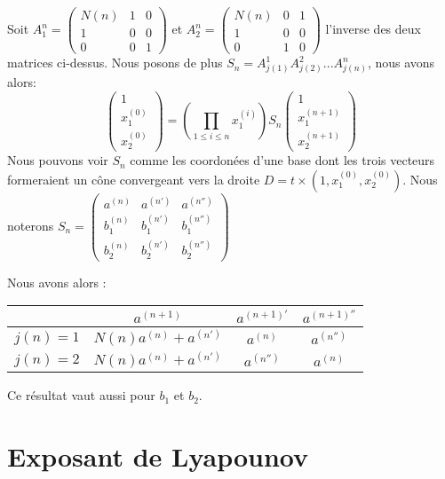 \documentclass[12pt]{article}
\theoremstyle{plain}%
\theoremstyle{definition}
\theoremstyle{remark}
\begin{document}
Soit $A_1^n=\begin{pmatrix} N(n) & 1 & 0 \\1 & 0 & 0 \\0 & 0 & 1 \end{pmatrix}$ et $A_2^n=\begin{pmatrix} N(n) & 0 & 1 \\1 & 0 & 0 \\0 & 1 & 0 \end{pmatrix}$ l'inverse des deux matrices ci-dessus. Nous posons de plus $S_n=A_{j(1)}^1 A_{j(2)}^2 ... A_{j(n)}^n$, nous avons alors:\[
\begin{pmatrix} 1 \\ x_1^{(0)} \\ x_2^{(0)} \end{pmatrix} = (\prod_{1 \leq i \leq n} x_1^{(i)})S_n \begin{pmatrix} 1 \\ x_1^{(n+1)} \\ x_2^{(n+1)} \end{pmatrix}
\]
Nous pouvons voir $S_n$ comme les coordonées d'une base dont les trois vecteurs formeraient un cône convergeant vers la droite $D=t \times (1,x_1^{(0)},x_2^{(0)})$. \newline
Nous noterons $S_n=\begin{pmatrix} a^{(n)} & a^{(n')} & a^{(n'')} \\ b_1^{(n)} & b_1^{(n')} & b_1^{(n'')} \\ b_2^{(n)} & b_2^{(n')} & b_2^{(n'')} \end{pmatrix}$ \newline

Nous avons alors :
\begin{center}
\begin{tabular}{c|c|c|c|}
  & $a^{(n+1)}$ & $a^{(n+1)'}$ & $a^{(n+1)''}$\\
\hline
$j(n)=1$ & $N(n)a^{(n)}+a^{(n')}$ & $a^{(n)}$ & $a^{(n'')}$ \\
$j(n)=2$ & $N(n)a^{(n)}+a^{(n')}$ & $a^{(n'')}$ & $a^{(n)}$ \\
\end{tabular}
\end{center}
Ce résultat vaut aussi pour $b_1$ et $b_2$.

\section{Exposant de Lyapounov}
\end{document}
